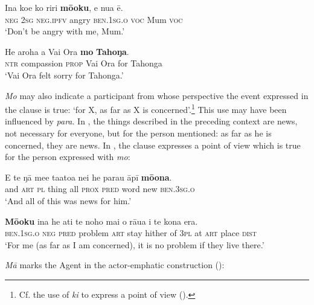 \ea\label{ex:4.286}
\gll {\ꞌ}Ina koe ko riri \textbf{mō{\ꞌ}oku}, e nua ē. \\
\textsc{neg} \textsc{2sg} \textsc{neg.ipfv} angry \textsc{ben.1sg.o} \textsc{voc} Mum \textsc{voc} \\

\glt 
‘Don’t be angry with me, Mum.’ \textstyleExampleref{[R229.497]} 
\z

\ea\label{ex:4.287}
\gll He {\ꞌ}aroha a Vai Ora \textbf{mo} \textbf{Tahoŋa}. \\
\textsc{ntr} compassion \textsc{prop} Vai Ora for Tahonga \\

\glt
‘Vai Ora felt sorry for Tahonga.’ \textstyleExampleref{[R301.249]} 
\z

\textit{Mo} may also indicate a participant from whose perspective the event expressed in the clause is true: ‘for X, as far as X is concerned’.\footnote{\label{fn:236}Cf. the use of \textit{ki} to express a point of view ().} This use may have been influenced by  \textit{para}. In , the things described in the preceding context are news, not necessary for everyone, but for the person mentioned: as far as he is concerned, they are news. In , the clause expresses a point of view which is true for the person expressed with \textit{mo}:

\ea\label{ex:4.288}
\gll {\ꞌ}E te ŋā me{\ꞌ}e ta{\ꞌ}ato{\ꞌ}a nei he parau {\ꞌ}āpī \textbf{mō{\ꞌ}ona}.\\
and \textsc{art} \textsc{pl} thing all \textsc{prox} \textsc{pred} word new \textsc{ben.3sg.o}\\

\glt 
‘And all of this was news for him.’ \textstyleExampleref{[R363.055]} 
\z

\ea\label{ex:4.289}
\gll \textbf{Mō{\ꞌ}oku} {\ꞌ}ina he {\ꞌ}ati te noho mai o rāua {\ꞌ}i te kona era.\\
\textsc{ben.1sg.o} \textsc{neg} \textsc{pred} problem \textsc{art} stay hither of \textsc{3pl} at \textsc{art} place \textsc{dist}\\

\glt
‘For me (as far as I am concerned), it is no problem if they live there.’ \textstyleExampleref{[R647.163]} 
\z

\textit{Mā} marks the Agent in the  actor-emphatic construction ():

